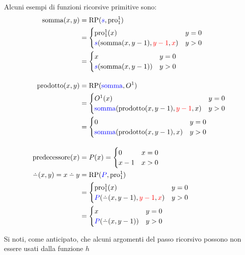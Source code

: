 Alcuni esempi di funzioni ricorsive primitive sono:
$$\begin{aligned}
    \text{somma}(x,y) &= \RP({\color{blue}s},\text{pro}^1_1)\\
    &= \begin{cases}
        \text{pro}_1^1(x) & y=0\\
        {\color{blue}s}(\text{somma}(x,y-1),{\color{red}y-1},{\color{red}x}) & y>0
    \end{cases}\\
    &= \begin{cases}
        x & y=0\\
        {\color{blue}s}(\text{somma}(x,y-1)) & y>0
    \end{cases}\\[1em]
    \text{prodotto}(x,y) &= \RP({\color{blue}\text{somma}},O^1)\\
    &= \begin{cases}
        O^1(x) & y=0\\
        {\color{blue}\text{somma}}(\text{prodotto}(x,y-1),{\color{red}y-1},x) & y>0
    \end{cases}\\
    &= \begin{cases}
        0 & y=0\\
        {\color{blue}\text{somma}}(\text{prodotto}(x,y-1),x) & y>0
    \end{cases}\\[1em]
    \text{predecessore}(x) &= P(x) = \begin{cases}
        0 & x=0 \\ x-1 & x>0
    \end{cases}\\
    \dotminus(x,y)=x\dotminus y &= \RP({\color{blue}P},\text{pro}_1^1)\\
    &= \begin{cases}
        \text{pro}^1_1(x) & y=0\\
        {\color{blue}P}(\dotminus(x,y-1),{\color{red}y-1},{\color{red}x}) & y>0
    \end{cases}\\
    &= \begin{cases}
        x & y=0\\
        {\color{blue}P}(\dotminus(x,y-1)) & y>0
    \end{cases}
\end{aligned}$$

Si noti, come anticipato, che alcuni argomenti del passo ricorsivo {\color{red} possono non
essere usati} dalla funzione {\color{blue}$h$}

